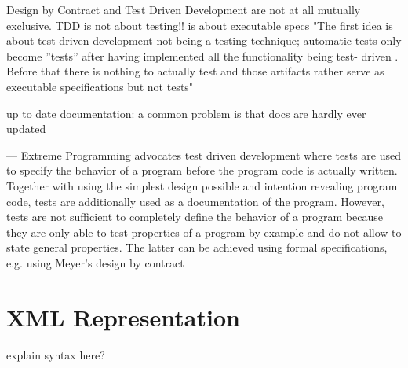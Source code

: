 Design by Contract and Test Driven Development are not at all mutually exclusive.
TDD is not about testing!! is about executable specs
"The first idea is about test-driven development not being a testing technique;
automatic tests only become ”tests” after having implemented all the functionality
being test-
driven
. Before that there is nothing to actually
test
and those artifacts
rather serve as executable
specifications
but not tests"

up to date documentation: a common problem is that docs are hardly ever updated


---
Extreme Programming advocates test driven development where tests are used
to specify the behavior of a program before the program code is actually written.
Together with using the simplest design possible and intention revealing program
code, tests are additionally used as a documentation of the program. However,
tests are not sufficient to completely define the behavior of a program because
they are only able to test properties of a program by example and do not allow to
state general properties. The latter can be achieved using formal specifications,
e.g. using Meyer’s design by contract %

\section{XML Representation}
explain syntax here?